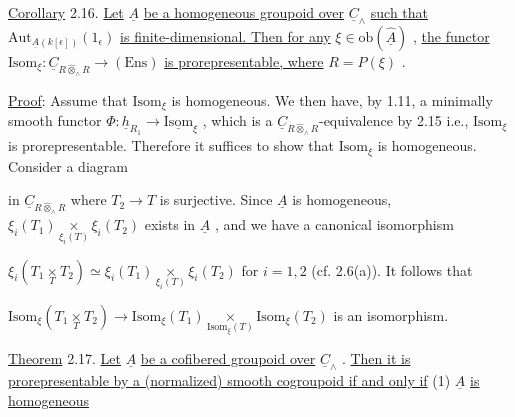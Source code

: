 \underline{Corollary} 2.16.  \underline{Let}  $\underline{A}$  \underline{be a homogeneous groupoid over}  $\underline{C}_{\wedge}$  \underline{such that} $\mathrm{Aut}_{\underline{A}(k[\epsilon])}(1_{\epsilon})$  \underline{is finite-dimensional. Then for any}  $\xi \in \mathrm{ob}(\hat{\underline{A}})$  , \underline{the functor} $\mathrm{Isom}_{\xi} : \underline{C}_{R \hat{\otimes}_{\wedge} R} \longrightarrow (\mathrm{Ens})$  \underline{is prorepresentable, where}  $R = P(\xi)$  .

\underline{Proof}:  Assume that  $\mathrm{Isom}_{\xi}$  is homogeneous. We then have, by 1.11, a minimally smooth functor  $\Phi : \underline{h}_{R_{1}} \to \underline{\mathrm{Isom}}_{\xi}$  , which is a  $\underline{C}_{R \hat{\otimes}_{\wedge} R}$-equivalence by 2.15 i.e., $\mathrm{Isom}_{\xi}$  is prorepresentable. Therefore it suffices to show that  $\mathrm{Isom}_{\xi}$  is homogeneous. Consider a diagram

\begin{center}
\end{center}
in  $\underline{C}_{R \hat{\otimes}_{\wedge} R}$  where  $T_{2} \longrightarrow T$  is surjective. Since  $\underline{A}$  is homogeneous, $\xi_{i}(T_{1}) \underset{\xi_{i}(T)}{\times} \xi_{i}(T_{2})$  exists in  $\underline{A}$  , and we have a canonical isomorphism

$\xi_{i}(T_{1} \underset{T}{\times} T_{2}) \simeq \xi_{i}(T_{1}) \underset{\xi_{i}(T)}{\times} \xi_{i}(T_{2})$  for  $i = 1,2$  (cf. 2.6(a)). It follows that

$\mathrm{Isom}_{\xi}(T_{1} \underset{T}{\times} T_{2}) \longrightarrow \mathrm{Isom}_{\xi}(T_{1}) \underset{\mathrm{Isom}_{\xi}(T)}{\times} \mathrm{Isom}_{\xi}(T_{2})$  is an isomorphism.

\underline{Theorem} 2.17.  \underline{Let}  $\underline{A}$  \underline{be a cofibered groupoid over}  $\underline{C}_{\wedge}$  . \underline{Then it is prorepresentable by a (normalized) smooth cogroupoid if and only if}
(1)  $\underline{A}$  \underline{is homogeneous}

